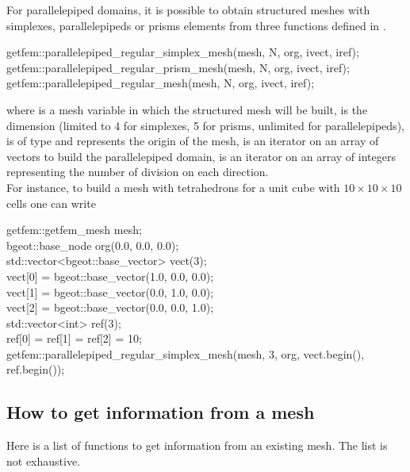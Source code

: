\documentclass[11pt,a4paper]{article}
\begin{document}
For parallelepiped domains, it is possible to obtain structured meshes with simplexes, parallelepipeds or prisms elements from three functions defined in . \\[0.5cm]
\begin{cppcode}
  getfem::parallelepiped\_regular\_simplex\_mesh(mesh, N, org, ivect, iref); \\
  getfem::parallelepiped\_regular\_prism\_mesh(mesh, N, org, ivect, iref); \\
  getfem::parallelepiped\_regular\_mesh(mesh, N, org, ivect, iref);
\end{cppcode}
where  is a mesh variable in which the structured mesh will be built,  is the dimension (limited to 4 for simplexes, 5 for prisms, unlimited for parallelepipeds),  is of type  and represents the origin of the mesh,  is an iterator on an array of  vectors to build the parallelepiped domain,  is an iterator on an array of  integers representing the number of division on each direction. \\[0.5cm]
For instance, to build a mesh with tetrahedrons for a unit cube with $10\times10\times10$ cells one can write\\[0.5cm]
\begin{cppcode}
  getfem::getfem\_mesh mesh; \\
  bgeot::base\_node org(0.0, 0.0, 0.0); \\
  std::vector<bgeot::base\_vector> vect(3); \\
  vect[0] = bgeot::base\_vector(1.0, 0.0, 0.0); \\
  vect[1] = bgeot::base\_vector(0.0, 1.0, 0.0); \\
  vect[2] = bgeot::base\_vector(0.0, 0.0, 1.0); \\
  std::vector<int> ref(3); \\
  ref[0] = ref[1] = ref[2] = 10; \\
  getfem::parallelepiped\_regular\_simplex\_mesh(mesh, 3, org, vect.begin(), ref.begin()); 
\end{cppcode}


\subsection{How to get information from a mesh}

Here is a list of functions to get information from an existing mesh. The list is not exhaustive.
\end{document}
